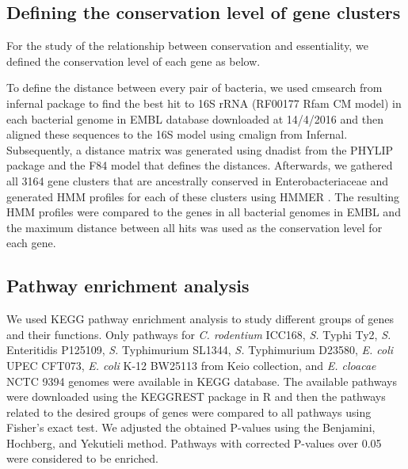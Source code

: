 \documentclass[12pt,letterpaper]{article}
\begin{document}
\subsection{Defining the conservation level of gene clusters}\label{meth:conservation}
For the study of the relationship between conservation and essentiality, we defined the conservation level of each gene as below.

To define the distance between every pair of bacteria, we used cmsearch from infernal package \cite{nawrocki_infernal_2013} to find the best hit to 16S rRNA (RF00177 Rfam CM model) in each bacterial genome in EMBL database \cite{stoesser_embl_2002} downloaded at 14/4/2016 and then aligned these sequences to the 16S model using cmalign from Infernal. Subsequently, a distance matrix was generated using dnadist from the PHYLIP package \cite{felsenstein_phylip-phylogeny_1989} and the F84 model that defines the distances.  Afterwards, we gathered all 3164 gene clusters that are ancestrally conserved in Enterobacteriaceae and generated HMM profiles for each of these clusters using HMMER \cite{eddy_accelerated_2011}. The resulting HMM profiles were compared to the genes in all bacterial genomes in EMBL and the maximum distance between all hits was used as the conservation level for each gene.

\subsection{Pathway enrichment analysis}
We used KEGG \cite{kanehisa_kegg:_2000} pathway enrichment analysis to study different groups of genes and their functions. Only pathways for \textit{C. rodentium} ICC168, \textit{S.} Typhi Ty2, \textit{S.} Enteritidis P125109, \textit{S.} Typhimurium SL1344, \textit{S.} Typhimurium D23580, \textit{E. coli} UPEC CFT073, \textit{E. coli} K-12 BW25113 from Keio collection, and \textit{E. cloacae} NCTC 9394 genomes were available in KEGG database. The available pathways were downloaded using the KEGGREST package in R and then the pathways related to the desired groups of genes were compared to all pathways using Fisher's exact test. We adjusted the obtained P-values using the Benjamini, Hochberg, and Yekutieli method. Pathways with corrected P-values over 0.05 were considered to be enriched.
\newpage

%

\end{document}
